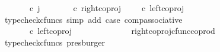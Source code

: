 \begin{isabellebody}
\ {\isachardoublequoteopen}{\isacharparenleft}{\kern0pt}{\isasymlangle}{\isasymf}{\isacharcomma}{\kern0pt}\ {\isasymf}{\isasymrangle}{\isasymamalg}\ {\isacharparenleft}{\kern0pt}{\isasymlangle}{\isasymt}{\isacharcomma}{\kern0pt}\ {\isasymf}{\isasymrangle}\ {\isasymamalg}{\isasymlangle}{\isasymf}{\isacharcomma}{\kern0pt}\ {\isasymt}{\isasymrangle}{\isacharparenright}{\kern0pt}{\isacharparenright}{\kern0pt}\ {\isasymcirc}\isactrlsub c\ j\ {\isacharequal}{\kern0pt}\ {\isacharparenleft}{\kern0pt}{\isacharparenleft}{\kern0pt}{\isasymlangle}{\isasymf}{\isacharcomma}{\kern0pt}\ {\isasymf}{\isasymrangle}{\isasymamalg}\ {\isacharparenleft}{\kern0pt}{\isasymlangle}{\isasymt}{\isacharcomma}{\kern0pt}\ {\isasymf}{\isasymrangle}\ {\isasymamalg}{\isasymlangle}{\isasymf}{\isacharcomma}{\kern0pt}\ {\isasymt}{\isasymrangle}{\isacharparenright}{\kern0pt}{\isacharparenright}{\kern0pt}\ {\isasymcirc}\isactrlsub c\ right{\isacharunderscore}{\kern0pt}coproj\ {\isasymone}\ {\isacharparenleft}{\kern0pt}{\isasymone}\ {\isasymCoprod}\ {\isasymone}{\isacharparenright}{\kern0pt}{\isacharparenright}{\kern0pt}\ {\isasymcirc}\isactrlsub c\ left{\isacharunderscore}{\kern0pt}coproj\ {\isasymone}\ {\isasymone}{\isachardoublequoteclose}\isanewline
\ \ \ \ \ \ \ \ \ \ \isamarkupfalse%
\ {\isacharparenleft}{\kern0pt}typecheck{\isacharunderscore}{\kern0pt}cfuncs{\isacharcomma}{\kern0pt}\ simp\ add{\isacharcolon}{\kern0pt}\ case{}\ comp{\isacharunderscore}{\kern0pt}associative{}{\isacharparenright}{\kern0pt}\isanewline
\ \ \ \ \ \ \ \ \isamarkupfalse%
\ \isamarkupfalse%
\ {\isachardoublequoteopen}{\isachardot}{\kern0pt}{\isachardot}{\kern0pt}{\isachardot}{\kern0pt}\ {\isacharequal}{\kern0pt}\ {\isacharparenleft}{\kern0pt}{\isasymlangle}{\isasymt}{\isacharcomma}{\kern0pt}\ {\isasymf}{\isasymrangle}\ {\isasymamalg}{\isasymlangle}{\isasymf}{\isacharcomma}{\kern0pt}\ {\isasymt}{\isasymrangle}{\isacharparenright}{\kern0pt}\ {\isasymcirc}\isactrlsub c\ left{\isacharunderscore}{\kern0pt}coproj\ {\isasymone}\ {\isasymone}{\isachardoublequoteclose}\isanewline
\ \ \ \ \ \ \ \ \ \ \isamarkupfalse%
\ right{\isacharunderscore}{\kern0pt}coproj{\isacharunderscore}{\kern0pt}cfunc{\isacharunderscore}{\kern0pt}coprod\ \isamarkupfalse%
\ {\isacharparenleft}{\kern0pt}typecheck{\isacharunderscore}{\kern0pt}cfuncs{\isacharcomma}{\kern0pt}\ presburger{\isacharparenright}{\kern0pt}\isanewline
\ \ \ \ \ \ \ \ \isamarkupfalse%
\ \isamarkupfalse%
\ {\isachardoublequoteopen}{\isachardot}{\kern0pt}{\isachardot}{\kern0pt}{\isachardot}{\kern0pt}\ {\isacharequal}{\kern0pt}\ {\isasymlangle}{\isasymt}{\isacharcomma}{\kern0pt}\ {\isasymf}{\isasymrangle}{\isachardoublequoteclose}\isanewline

\end{isabellebody}
